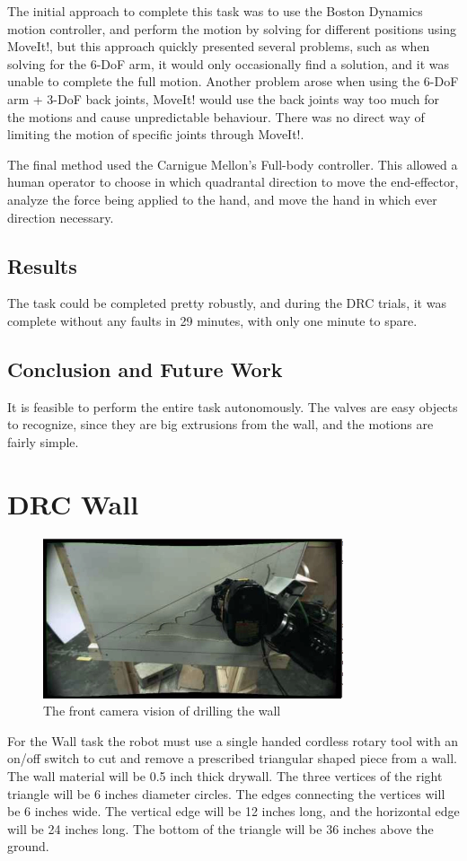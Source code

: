 \documentclass[12pt]{report}
\begin{document}
The initial approach to complete this task was to use the Boston Dynamics motion controller, and perform the motion by solving for different positions using MoveIt!, but this approach quickly presented several problems, such as when solving for the 6-DoF arm, it would only occasionally find a solution, and it was unable to complete the full motion. Another problem arose when using the 6-DoF arm + 3-DoF back joints, MoveIt! would use the back joints way too much for the motions and cause unpredictable behaviour. There was no direct way of limiting the motion of specific joints through MoveIt!.

The final method used the Carnigue Mellon's Full-body controller. This allowed a human operator to choose in which quadrantal direction to move the end-effector, analyze the force being applied to the hand, and move the hand in which ever direction necessary. 

\subsection{Results}
The task could be completed pretty robustly, and during the DRC trials, it was complete without any faults in 29 minutes, with only one minute to spare. 

\subsection{Conclusion and Future Work}
It is feasible to perform the entire task autonomously. The valves are easy objects to recognize, since they are big extrusions from the wall, and the motions are fairly simple. 

\section{DRC Wall}
\begin{figure}
  \begin{center}
    \includegraphics[scale=0.5]{images/drilling2.png}
  \end{center}
  \caption{The front camera vision of drilling the wall}
\end{figure}
For the Wall task the robot must use a single handed cordless rotary tool with an on/off switch to cut and remove a prescribed triangular shaped piece from a wall. The wall material will be 0.5 inch thick drywall. The three vertices of the right triangle will be 6 inches diameter circles. The edges connecting the vertices will be 6 inches wide. The vertical edge will be 12 inches long, and the horizontal edge will be 24 inches long. The bottom of the triangle will be 36 inches above the ground. \cite{walltask}
\end{document}
